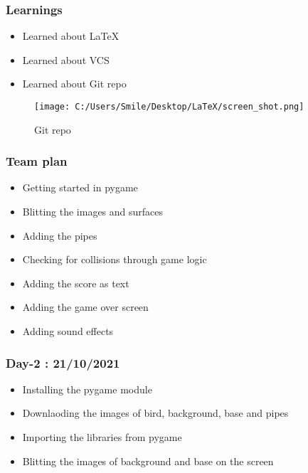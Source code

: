 \documentclass{beamer}
\begin{document}
  \begin{frame}
        \frametitle{Learnings}
	\begin{itemize}
	    \item Learned about LaTeX \item Learned about VCS \item Learned about Git repo
	\end{itemize}
    \end{frame}
 \begin{frame}
	 
	\begin{figure}
	    \texttt{[image: C:/Users/Smile/Desktop/LaTeX/screen\_shot.png]}
	    \caption{Git repo}
	\end{figure}
 \end{frame}
    \begin{frame}
	\frametitle{Team plan}
        \begin{itemize}
	    \item Getting started in pygame\item Blitting the images and surfaces\item Adding the pipes\item Checking for collisions through game logic\item Adding the score as text\item Adding the game over screen\item Adding sound effects
        \end{itemize}
    \end{frame}
 \begin{frame}
 \frametitle{Day-2 : 21/10/2021}	 
	\begin{itemize}
		\item Installing the pygame module \item Downlaoding the images of bird, background, base and pipes \item Importing the libraries from pygame \item Blitting the images of background and base on the screen
	\end{itemize}
    \end{frame}
\end{document}
